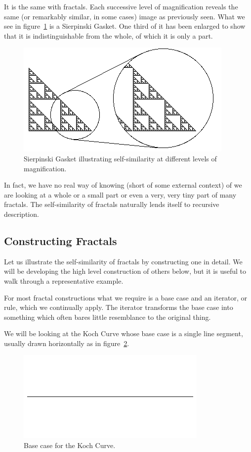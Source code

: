 \documentclass[jou,apacite]{apa6}
\begin{document}
It is the same with fractals.  Each successive level of magnification reveals the same (or remarkably similar, in some cases) image as previously seen.  What we see in figure~\ref{fig:fractalmag} is a Sierpinski Gasket.  One third of it has been enlarged to show that it is indistinguishable from the whole, of which it is only a part.  

\begin{figure}[htpb]
  \centering
  \includegraphics[width=\columnwidth]{images/GasketMag.png}
  \caption{Sierpinski Gasket illustrating self-similarity at different levels of magnification.}
  \label{fig:fractalmag}
\end{figure}

In fact, we have no real way of knowing (short of some external context) of we are looking at a whole or a small part or even a very, very tiny part of many fractals.  The self-similarity of fractals naturally lends itself to recursive description.

\subsection{Constructing Fractals}
Let us illustrate the self-similarity of fractals by constructing one in detail.  We will be developing the high level construction of others below, but it is useful to walk through a representative example.

For most fractal constructions what we require is a base case and an iterator, or rule, which we continually apply.  The iterator transforms the base case into something which often bares little resemblance to the original thing.

We will be looking at the Koch Curve whose base case is a single line segment, usually drawn horizontally as in figure~\ref{fig:koch0}.
\begin{figure}[htpb]
  \centering
  \includegraphics[width=0.75\columnwidth]{images/Koch0.png}
  \caption{Base case for the Koch Curve.}
  \label{fig:koch0}
\end{figure}
\end{document}
